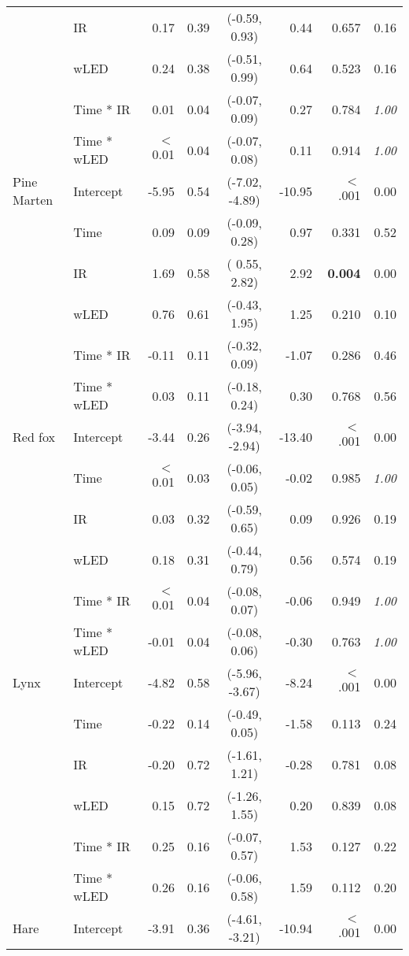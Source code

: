 {{\begin{tabular}[c]{llrlcrrr}
& IR & 0.17 & 0.39 & (-0.59,  0.93) & 0.44 & 0.657  & 0.16 \\ 
& wLED & 0.24 & 0.38 & (-0.51,  0.99) & 0.64 & 0.523  & 0.16 \\ 
& Time * IR & 0.01 & 0.04 & (-0.07,  0.09) & 0.27 & 0.784  & \textit{1.00} \\ 
& Time * wLED & $<$ 0.01 & 0.04 & (-0.07,  0.08) & 0.11 & 0.914  & \textit{1.00} \\ 
\midrule
Pine Marten & Intercept & -5.95 & 0.54 & (-7.02, -4.89) & -10.95 & $<$ .001 & 0.00 \\ 
& Time & 0.09 & 0.09 & (-0.09,  0.28) & 0.97 & 0.331  & 0.52 \\ 
& IR & 1.69 & 0.58 & ( 0.55,  2.82) & 2.92 & \textbf{0.004}  & 0.00 \\ 
& wLED & 0.76 & 0.61 & (-0.43,  1.95) & 1.25 & 0.210  & 0.10 \\ 
& Time * IR & -0.11 & 0.11 & (-0.32,  0.09) & -1.07 & 0.286  & 0.46 \\ 
& Time * wLED & 0.03 & 0.11 & (-0.18,  0.24) & 0.30 & 0.768  & 0.56 \\ 
\midrule
Red fox & Intercept & -3.44 & 0.26 & (-3.94, -2.94) & -13.40 & $<$ .001 & 0.00 \\ 
& Time & $<$ 0.01 & 0.03 & (-0.06,  0.05) & -0.02 & 0.985  & \textit{1.00} \\ 
& IR & 0.03 & 0.32 & (-0.59,  0.65) & 0.09 & 0.926  & 0.19 \\ 
& wLED & 0.18 & 0.31 & (-0.44,  0.79) & 0.56 & 0.574  & 0.19 \\ 
& Time * IR & $<$ 0.01 & 0.04 & (-0.08,  0.07) & -0.06 & 0.949  & \textit{1.00} \\ 
& Time * wLED & -0.01 & 0.04 & (-0.08,  0.06) & -0.30 & 0.763  & \textit{1.00} \\ 
\midrule
Lynx & Intercept & -4.82 & 0.58 & (-5.96, -3.67) & -8.24 & $<$ .001 & 0.00 \\ 
& Time & -0.22 & 0.14 & (-0.49,  0.05) & -1.58 & 0.113  & 0.24 \\ 
& IR & -0.20 & 0.72 & (-1.61,  1.21) & -0.28 & 0.781  & 0.08 \\ 
& wLED & 0.15 & 0.72 & (-1.26,  1.55) & 0.20 & 0.839  & 0.08 \\ 
& Time * IR & 0.25 & 0.16 & (-0.07,  0.57) & 1.53 & 0.127  & 0.22 \\ 
& Time * wLED & 0.26 & 0.16 & (-0.06,  0.58) & 1.59 & 0.112  & 0.20 \\ 
\midrule
Hare & Intercept & -3.91 & 0.36 & (-4.61, -3.21) & -10.94 & $<$ .001 & 0.00 \\ 

\end{tabular}}}
